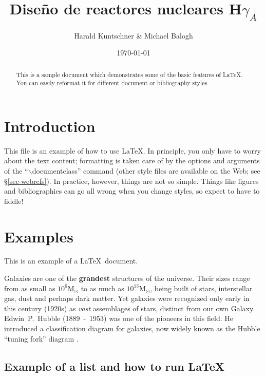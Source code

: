 \documentclass[11pt,a4paper]{emulateapj}
\def \HgA {H$\gamma_A$}
\begin{document}
\title{Diseño de reactores nucleares \HgA}
\author{Harald Kuntschner \& Michael Balogh}
\date{\today}


\begin{abstract}
This is a sample document which demonstrates some of the basic features
of \LaTeX.  You can easily reformat it for different document or bibliography styles.
\end{abstract}

\maketitle




\section{Introduction}
This file is an example of how to use \LaTeX.  In principle, you only have to worry
about the text content; formatting is taken care of by the options and arguments of
the ``$\backslash$documentclass'' command (other style files are available on the Web;
see \S\ref{sec-webrefs}).  In practice, however, things are not so simple.  Things like
figures and bibliographies can go all wrong when you change styles, so expect to have
to fiddle!  

\section{Examples}

This is an example of a \LaTeX\ document.  

\medskip

Galaxies are one of the \textbf{grandest} structures of the universe.
Their sizes range from as small as $10^6 \text{M}_\odot$ to as much as
$10^{13} \text{M}_\odot$, being built of stars, interstellar gas, dust
and perhaps dark matter. Yet galaxies were recognized only early in
this century (1920s) as \textit{vast} assemblages of stars, distinct
from our own Galaxy. Edwin~P.~Hubble (1889~-~1953) was one of the
pioneers in this field. He introduced a classification diagram for
galaxies, now widely known as the Hubble ``tuning fork'' diagram
\cite[][see Figure~\ref{fig:hubble_dia} for a revised Hubble
diagram]{hub36}.


%
%
\subsection{Example of a list and how to run \LaTeX} 
\end{document}
